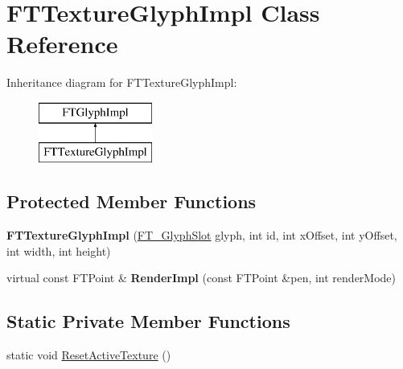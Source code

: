 \hypertarget{class_f_t_texture_glyph_impl}{}\section{F\+T\+Texture\+Glyph\+Impl Class Reference}
\label{class_f_t_texture_glyph_impl}
Inheritance diagram for F\+T\+Texture\+Glyph\+Impl\+:\begin{figure}[H]
\begin{center}
\leavevmode
\includegraphics[height=2.000000cm]{class_f_t_texture_glyph_impl}
\end{center}
\end{figure}
\subsection*{Protected Member Functions}
\begin{DoxyCompactItemize}
\item 
{\bfseries F\+T\+Texture\+Glyph\+Impl} (\hyperlink{struct_f_t___glyph_slot_rec__}{F\+T\+\_\+\+Glyph\+Slot} glyph, int id, int x\+Offset, int y\+Offset, int width, int height)\hypertarget{class_f_t_texture_glyph_impl_a63893590c3c3c45da5f3925ae9a97abd}{}\label{class_f_t_texture_glyph_impl_a63893590c3c3c45da5f3925ae9a97abd}

\item 
virtual const F\+T\+Point \& {\bfseries Render\+Impl} (const F\+T\+Point \&pen, int render\+Mode)\hypertarget{class_f_t_texture_glyph_impl_a3fce2bf9435946ae0f8ee5eacbe7f702}{}\label{class_f_t_texture_glyph_impl_a3fce2bf9435946ae0f8ee5eacbe7f702}

\end{DoxyCompactItemize}
\subsection*{Static Private Member Functions}
\begin{DoxyCompactItemize}
\item 
static void \hyperlink{class_f_t_texture_glyph_impl_ae533cf9f5111e79f7c9423b996173467}{Reset\+Active\+Texture} ()
\end{DoxyCompactItemize}
